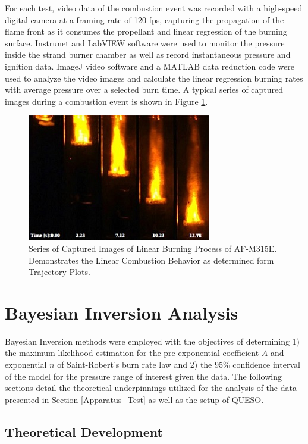 \documentclass{article}
\begin{document}
For each test, video data of the combustion event was recorded with a high-speed digital camera at a framing rate
of 120 fps, capturing the propagation of the flame front as it consumes the propellant and linear regression of the
burning surface. Instrunet and LabVIEW software were used to monitor the pressure inside the strand burner chamber
as well as record instantaneous pressure and ignition data. ImageJ video software and a MATLAB data reduction code
were used to analyze the video images and calculate the linear regression burning rates with average pressure over
a selected burn time. A typical series of captured images during a combustion event is shown in Figure \ref{fig5}.

\begin{figure}[htb!]
\centering
\includegraphics[width=0.25\textheight]{Figure_5.jpg}
\caption{Series of Captured Images of Linear Burning Process of AF-M315E. Demonstrates the Linear Combustion Behavior as determined form Trajectory Plots.}
\label{fig5}
\end{figure}


\section{Bayesian Inversion Analysis} \label{Bayesian_Inv_Analysis}

Bayesian Inversion methods were employed with the objectives of determining 1) the maximum likelihood estimation for
the pre-exponential coefficient $A$ and exponential $n$ of Saint-Robert's burn rate law and 2) the 95\% confidence interval 
of the model for the pressure range of interest given the data. The following sections detail the theoretical 
underpinnings utilized for the analysis of the data presented in Section \ref{Apparatus_Test} as well as the setup of QUESO.

\subsection{Theoretical Development} \label{Theory_Dev}
\end{document}
